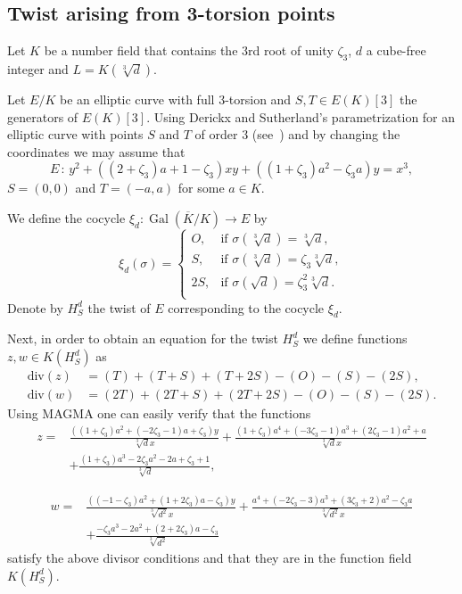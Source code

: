 \documentclass[a4paper, 12pt]{amsart}
\theoremstyle{definition}
\theoremstyle{remark}
\newcommand{\GalK}{\operatorname{Gal}(\overline{K}/K)}
\renewcommand{\div}{\mathrm{div}}
\numberwithin{equation}{section}
\begin{document}
\subsection{Twist arising from 3-torsion points}\label{sec:2.2}

Let $K$ be a number field that contains the $3$rd root of unity $\zeta_3$, $d$ a cube-free integer and $L=K(\sqrt[3]{d})$.

Let $E/K$ be an elliptic curve with full $3$-torsion  and $S,T \in E(K)[3]$ the generators of $E(K)[3]$. 
Using Derickx and Sutherland's parametrization for an elliptic curve with points $S$ and $T$ of order $3$ (see~\cite{Derickx_2017}) and by changing the coordinates we may assume that
\[
    E\, : \, y^2+((2+\zeta_3)a+1-\zeta_3)xy+((1+\zeta_3)a^2-\zeta_3 a)y=x^3,
\]
$S=(0,0)$ and $T=(-a,a)$ for some $a \in K$.

We define the cocycle $\xi_d : \GalK \to E$ by
\[
    \xi_d (\sigma)=
    \begin{cases}
        O, & \text{if } \sigma(\sqrt[3]{d})=\sqrt[3]{d}, \\
        S, & \text{if } \sigma(\sqrt[3]{d})=\zeta_3\sqrt[3]{d},\\
        2S, & \text{if } \sigma(\sqrt{d})=\zeta_3^2\sqrt[3]{d}.\\
    \end{cases}
\]
Denote by $H_S^d$ the twist of $E$ corresponding to the cocycle $\xi_d$.

Next, in order to obtain an equation for the twist $H_S^d$ we define functions $z,w \in K(H_S^d)$ as
\begin{align*}
    \div{(z)} &= (T)+(T+S)+(T+2S)-(O)-(S)-(2S),\\
    \div{(w)} &= (2T)+(2T+S)+(2T+2S)-(O)-(S)-(2S).
\end{align*}
Using MAGMA one can easily verify that the functions 
\begin{align*}
    z = & \frac{((1+\zeta_3)a^2+(-2\zeta_3-1)a+\zeta_3)y}{\sqrt[3]{d}x} +\frac{(1+\zeta_3)a^4+(-3\zeta_3-1)a^3+(2\zeta_3-1)a^2+a}{\sqrt[3]{d}x} \\
        &+\frac{(1+\zeta_3)a^3-2\zeta_3 a^2-2a+\zeta_3+1}{\sqrt[3]{d}},
\end{align*}

\begin{align*}
    w = &\frac{((-1-\zeta_3)a^2+(1+2\zeta_3)a-\zeta_3)y}{\sqrt[3]{d^2}x}+\frac{a^4+(-2\zeta_3-3)a^3+(3\zeta_3+2)a^2-\zeta_3 a}{\sqrt[3]{d^2}x}\\
    &+\frac{-\zeta_3 a^3-2a^2+ (2+2\zeta_3)a-\zeta_3}{\sqrt[3]{d^2}}
\end{align*}
satisfy the above divisor conditions and that they are in the function field $K(H_S^d)$. 
\end{document}

